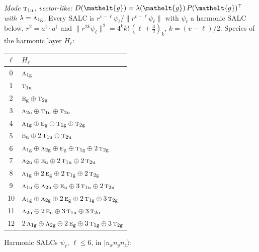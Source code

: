 \documentclass[11pt]{article}
\newcommand{\eltfont}[1]{{\let\sigma\eltsigma\mathelt{#1}}}
\newcommand{\irr}[1]{\text{\normalfont\scshape #1}}
\newcommand{\elt}[1]{\eltfont{#1}}
\newcommand{\ptag}[1]{\mathrm{#1}}
\newcommand{\occ}[1]{\lvert #1\rangle}
\newcommand{\gel}{\elt{g}}             %
\newcommand{\gmat}{P(\gel)^{\top}}     %
\begin{document}
\emph{Mode $\irr{t}_{1\ptag{u}}$, vector-like: $D(\gel)=\lambda(\gel)\,\gmat$ with $\lambda=\irr{a}_{1\ptag{g}}$.} Every SALC is $r^{v-\ell}\psi_\ell/\lVert r^{v-\ell}\psi_\ell\rVert$ with $\psi_\ell$ a harmonic SALC below, $r^2=a^\dagger\!\cdot a^\dagger$ and $\lVert r^{2k}\psi_\ell\rVert^2=4^kk!\,(\ell+\tfrac32)_k$, $k=(v-\ell)/2$. Species of the harmonic layer $H_\ell$:
\begin{longtable}{c l}\hline $\ell$ & $H_\ell$\\ \hline\endhead
0 & $\irr{a}_{1\ptag{g}}$\\
1 & $\irr{t}_{1\ptag{u}}$\\
2 & $\irr{e}_{\ptag{g}}\oplus \irr{t}_{2\ptag{g}}$\\
3 & $\irr{a}_{2\ptag{u}}\oplus \irr{t}_{1\ptag{u}}\oplus \irr{t}_{2\ptag{u}}$\\
4 & $\irr{a}_{1\ptag{g}}\oplus \irr{e}_{\ptag{g}}\oplus \irr{t}_{1\ptag{g}}\oplus \irr{t}_{2\ptag{g}}$\\
5 & $\irr{e}_{\ptag{u}}\oplus 2\,\irr{t}_{1\ptag{u}}\oplus \irr{t}_{2\ptag{u}}$\\
6 & $\irr{a}_{1\ptag{g}}\oplus \irr{a}_{2\ptag{g}}\oplus \irr{e}_{\ptag{g}}\oplus \irr{t}_{1\ptag{g}}\oplus 2\,\irr{t}_{2\ptag{g}}$\\
7 & $\irr{a}_{2\ptag{u}}\oplus \irr{e}_{\ptag{u}}\oplus 2\,\irr{t}_{1\ptag{u}}\oplus 2\,\irr{t}_{2\ptag{u}}$\\
8 & $\irr{a}_{1\ptag{g}}\oplus 2\,\irr{e}_{\ptag{g}}\oplus 2\,\irr{t}_{1\ptag{g}}\oplus 2\,\irr{t}_{2\ptag{g}}$\\
9 & $\irr{a}_{1\ptag{u}}\oplus \irr{a}_{2\ptag{u}}\oplus \irr{e}_{\ptag{u}}\oplus 3\,\irr{t}_{1\ptag{u}}\oplus 2\,\irr{t}_{2\ptag{u}}$\\
10 & $\irr{a}_{1\ptag{g}}\oplus \irr{a}_{2\ptag{g}}\oplus 2\,\irr{e}_{\ptag{g}}\oplus 2\,\irr{t}_{1\ptag{g}}\oplus 3\,\irr{t}_{2\ptag{g}}$\\
11 & $\irr{a}_{2\ptag{u}}\oplus 2\,\irr{e}_{\ptag{u}}\oplus 3\,\irr{t}_{1\ptag{u}}\oplus 3\,\irr{t}_{2\ptag{u}}$\\
12 & $2\,\irr{a}_{1\ptag{g}}\oplus \irr{a}_{2\ptag{g}}\oplus 2\,\irr{e}_{\ptag{g}}\oplus 3\,\irr{t}_{1\ptag{g}}\oplus 3\,\irr{t}_{2\ptag{g}}$\\
\hline\end{longtable}
Harmonic SALCs $\psi_\ell$, $\ell\le6$, in $\occ{n_xn_yn_z}$:
\end{document}
